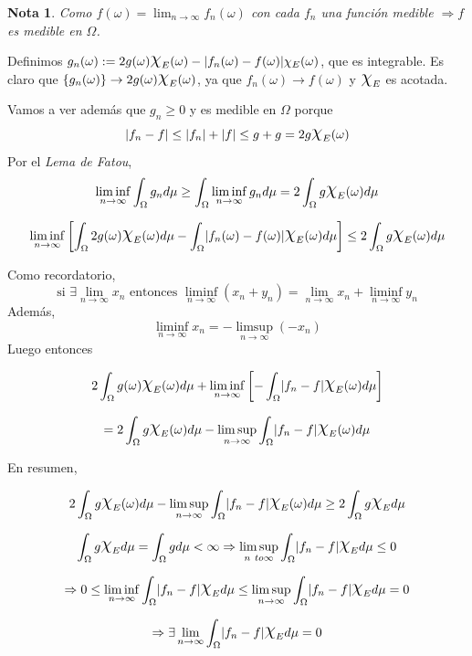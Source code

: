 \documentclass[11pt, a4paper]{article}
\makeatletter
\newif\IfInSansMode
\let\oldsf\sffamily
\renewcommand*{\sffamily}{\oldsf\mathversion{sans}\InSansModetrue}
\let\oldnorm\normalfont
\renewcommand*{\normalfont}{\oldnorm\InSansModefalse\mathversion{normal}}
\providecommand{\abs}[1]{\lvert#1\rvert}
\DeclareRobustCommand{\rchi}{{\Large \mathpalette\irchi\relax}}
\newcommand{\irchi}[2]{\raisebox{0.4\depth}{$#1\chi$}} %
\renewenvironment{proof}[1][\proofname] {\par\pushQED{\qed}\normalfont\topsep6\p@\@plus6\p@\relax\trivlist\item[\hskip\labelsep\itshape\sffamily#1\@addpunct{.}]\ignorespaces}{\popQED\endtrivlist\@endpefalse}
\theoremstyle{theorem-style}
\theoremstyle{definition-style}
\theoremstyle{remark-style}
\newtheorem*{nota}{Nota}
\theoremstyle{example-style}
\makeatother
\begin{document}
\begin{nota}
  Como $f(\omega) = \lim_{n \to \infty} f_n(\omega)$ con cada $f_n$ una función medible $\Rightarrow f$ es medible en $\Omega$.
\end{nota}

\begin{proof}
  Definimos $g_n(\omega) := 2g(\omega)\rchi_E(\omega) - \abs{f_n(\omega) - f(\omega)} \chi_E (\omega)$, que es integrable. Es claro que $\{g_n(\omega)\} \rightarrow 2g(\omega)\rchi_E(\omega)$, ya que $f_n(\omega) \rightarrow f(\omega)$ y $\rchi_E$ es acotada.
  
  Vamos a ver además que $g_n \geq 0$ y es medible en $\Omega$ porque $$|f_n - f| \leq |f_n| + |f| \leq g + g = 2g\rchi_E(\omega)$$
  Por el \textit{Lema de Fatou}, 
  $$\liminf_{n \to \infty} \int_{\Omega} g_n d \mu \geq \int_{\Omega} \liminf_{n \to \infty} g_n d \mu = 2 \int_{\Omega} g\rchi_E(\omega)d\mu$$
  
  $$\liminf_{n \to \infty} \left[\int_{\Omega} 2g(\omega)\rchi_E(\omega) d\mu - \int_{\Omega} \abs{f_n(\omega) - f(\omega)}\rchi_E(\omega) d \mu \right] \leq 2\int_{\Omega} g\rchi_E(\omega) d \mu$$

  Como recordatorio, $$\text{si } \exists \lim_{n \to \infty} x_n \text{ entonces } \liminf_{n \to \infty} (x_n + y_n) = \lim_{n \to \infty} x_n + \liminf_{n \to \infty} y_n$$ Además, $$\liminf_{n \to \infty} x_n = - \limsup_{n \to \infty} (- x_n)$$
  Luego entonces
  
  $$2 \int_{\Omega} g(\omega)\rchi_E(\omega) d \mu + \liminf_{n \to \infty} \left[-\int_{\Omega} \abs{f_n - f} \rchi_E(\omega) d \mu \right]$$
  
  $$ = 2 \int_{\Omega} g \rchi_E(\omega) d \mu - \limsup_{n \to \infty} \int_{\Omega} \abs{f_n - f} \rchi_E(\omega) d \mu$$
  
  En resumen,
  
  $$2 \int_{\Omega} g \rchi_E(\omega) d \mu - \limsup_{n \to \infty} \int_{\Omega} \abs{f_n - f} \rchi_E(\omega) d \mu \geq 2 \int_{\Omega} g \rchi_{E} d \mu$$
  
  $$\int_{\Omega} g \rchi_{E} d \mu = \int_{\Omega} g  d \mu < \infty \Rightarrow \limsup_{n \ to \infty} \int_{\Omega} \abs{f_n - f} \rchi_E d \mu \leq 0$$
  
  $$\Rightarrow 0 \leq \liminf_{n \to \infty} \int_{\Omega} \abs{f_n - f} \rchi_E d \mu \leq \limsup_{n \to \infty} \int_{\Omega} \abs{f_n - f} \rchi_E d \mu = 0$$
  
  $$\Rightarrow \exists \lim_{n \to \infty} \int_{\Omega} \abs{f_n - f} \rchi_E d \mu = 0$$
  

\end{proof}
\end{document}
